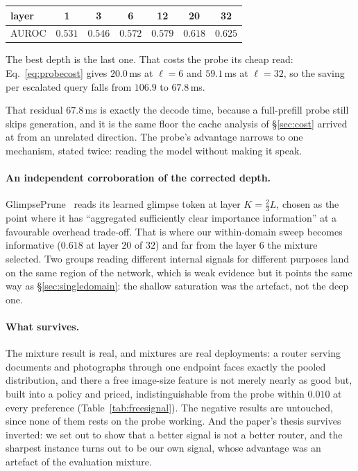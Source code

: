 \documentclass[10pt,twocolumn]{article}
\theoremstyle{plain}
\begin{document}
\begin{center}\small
\begin{tabular}{lcccccc}
\toprule
layer & 1 & 3 & 6 & 12 & 20 & 32 \\
\midrule
AUROC & $0.531$ & $0.546$ & $0.572$ & $0.579$ & $0.618$ & $\mathbf{0.625}$ \\
\bottomrule
\end{tabular}
\end{center}

\noindent The best depth is the last one. That costs the probe its cheap read:
Eq.~\ref{eq:probecost} gives $20.0$\,ms at $\ell=6$ and $59.1$\,ms at
$\ell=32$, so the saving per escalated query falls from $106.9$ to $67.8$\,ms.

That residual $67.8$\,ms is exactly the decode time, because a full-prefill probe still skips generation, and it is the
same floor the cache analysis of \S\ref{sec:cost} arrived at from an unrelated
direction. The probe's advantage narrows to one mechanism, stated twice: reading
the model without making it speak.

\paragraph{An independent corroboration of the corrected depth.}
GlimpsePrune~\cite{glimpseprune} reads its learned glimpse token at layer $K =
\tfrac{2}{3}L$, chosen as the point where it has ``aggregated sufficiently clear
importance information'' at a favourable overhead trade-off. That is where our
within-domain sweep becomes informative ($0.618$ at layer $20$ of $32$) and far
from the layer $6$ the mixture selected. Two groups reading different internal
signals for different purposes land on the same region of the network, which is
weak evidence but it points the same way as \S\ref{sec:singledomain}: the
shallow saturation was the artefact, not the deep one.

\paragraph{What survives.} The mixture result is real, and mixtures are real
deployments: a router serving documents and photographs
through one endpoint faces exactly the pooled distribution, and there a free
image-size feature is not merely nearly as good but, built into a policy and
priced, indistinguishable from the probe within $0.010$ at every preference
(Table~\ref{tab:freesignal}). The negative results are untouched, since none of them rests on the
probe working. And the paper's thesis survives inverted: we set out to show that
a better signal is not a better router, and the sharpest instance turns out to
be our own signal, whose advantage was an artefact of the evaluation mixture.
\end{document}
